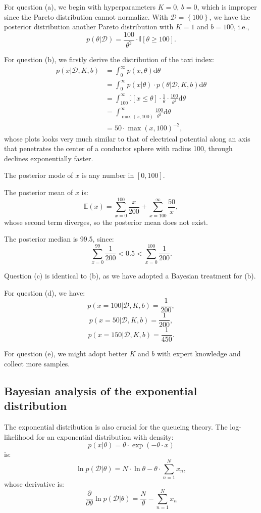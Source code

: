 \documentclass[UTF8]{ctexart}
\begin{document}
For question (a), we begin with hyperparameters $K=0$, $b=0$, which is improper since the Pareto distribution cannot normalize. 
With $\mathcal{D}=\left\{100\right\}$, we have the posterior distribution another Pareto distribution with $K=1$ and $b=100$, i.e.,
$$p(\theta|\mathcal{D})=\frac{100}{\theta^{2}}\cdot\mathbb{I}[\theta\geq 100].$$

For question (b), we firstly derive the distribution of the taxi index:
$$
\begin{aligned}
p(x|\mathcal{D},K,b)&=\int_{0}^{\infty}p(x,\theta)\text{d}\theta\\
&=\int_{0}^{\infty}p(x|\theta)\cdot p(\theta|\mathcal{D},K,b)\text{d}\theta\\
&=\int_{100}^{\infty}\mathbb{I}[x\leq\theta]\cdot\frac{1}{\theta}\cdot\frac{100}{\theta^{2}}\text{d}\theta\\
&=\int_{\max(x,100)}^{\infty}\frac{100}{\theta^{3}}\text{d}\theta\\
&=50\cdot\max(x,100)^{-2},
\end{aligned}
$$
whose plots looks very much similar to that of electrical potential along an axis that penetrates the center of a conductor sphere with radius 100, through declines exponentially faster. 

The posterior mode of $x$ is any number in $[0,100]$. 

The posterior mean of $x$ is:
$$\mathbb{E}(x)=\sum_{x=0}^{100}\frac{x}{200}+\sum_{x=100}^{\infty}\frac{50}{x},$$
whose second term diverges, so the posterior mean does not exist.

The posterior median is 99.5, since:
$$\sum_{x=0}^{99}\frac{1}{200}<0.5<\sum_{x=0}^{100}\frac{1}{200}.$$

Question (c) is identical to (b), as we have adopted a Bayesian treatment for (b).

For question (d), we have:
$$p(x=100|\mathcal{D},K,b)=\frac{1}{200},$$
$$p(x=50|\mathcal{D},K,b)=\frac{1}{200},$$
$$p(x=150|\mathcal{D},K,b)=\frac{1}{450}.$$

For question (e), we might adopt better $K$ and $b$ with expert knowledge and collect more samples. 

\subsection{Bayesian analysis of the exponential distribution}
The exponential distribution is also crucial for the queueing theory. 
The log-likelihood for an exponential distribution with density: 
$$p(x|\theta)=\theta\cdot \exp(-\theta\cdot x)$$ 
is:
$$\ln p(\mathcal{D}|\theta) = N\cdot\ln \theta - \theta\cdot \sum_{n=1}^{N}x_{n},$$
whose derivative is:
$$\frac{\partial}{\partial \theta} \ln p(\mathcal{D}|\theta) = \frac{N}{\theta} - \sum_{n=1}^{N}x_{n}$$
\end{document}
